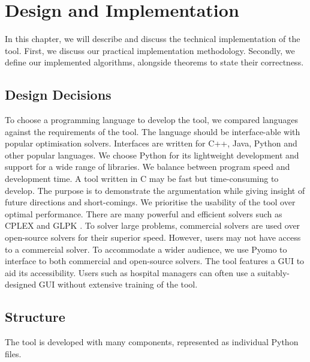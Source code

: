 \chapter{Design and Implementation}
\label{implementation}

In this chapter, we will describe and discuss the technical implementation of the tool. First, we discuss our practical implementation methodology. Secondly, we define our implemented algorithms, alongside theorems to state their correctness.

\section{Design Decisions}

To choose a programming language to develop the tool, we compared languages against the requirements of the tool. The language should be interface-able with popular optimisation solvers. Interfaces are written for C++, Java, Python and other popular languages. We choose Python for its lightweight development and support for a wide range of libraries.
\linespace
We balance between program speed and development time. A tool written in C may be fast but time-consuming to develop. The purpose is to demonstrate the argumentation while giving insight of future directions and short-comings. We prioritise the usability of the tool over optimal performance.
\linespace
There are many powerful and efficient solvers such as CPLEX and GLPK \cite{clp}. To solver large problems, commercial solvers are used over open-source solvers for their superior speed. However, users may not have access to a commercial solver. To accommodate a wider audience, we use Pyomo to interface to both commercial and open-source solvers.
\linespace
The tool features a GUI to aid its accessibility. Users such as hospital managers can often use a suitably-designed GUI without extensive training of the tool.

\section{Structure}
 
The tool is developed with many components, represented as individual Python files. 

